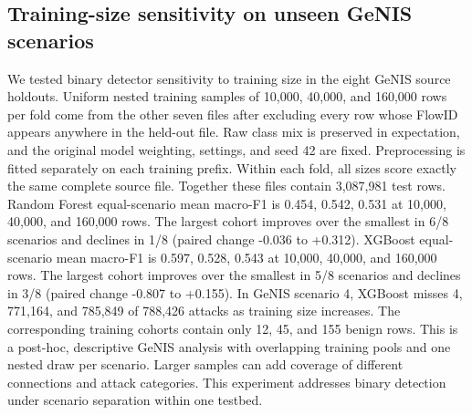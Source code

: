 \documentclass[journal,letterpaper]{IEEEtran}
\begin{document}
\subsection{Training-size sensitivity on unseen GeNIS scenarios}
We tested binary detector sensitivity to training size in the eight GeNIS source holdouts. Uniform nested training samples of 10,000, 40,000, and 160,000 rows per fold come from the other seven files after excluding every row whose FlowID appears anywhere in the held-out file. Raw class mix is preserved in expectation, and the original model weighting, settings, and seed 42 are fixed. Preprocessing is fitted separately on each training prefix. Within each fold, all sizes score exactly the same complete source file. Together these files contain 3,087,981 test rows.
Random Forest equal-scenario mean macro-F1 is 0.454, 0.542, 0.531 at 10,000, 40,000, and 160,000 rows. The largest cohort improves over the smallest in 6/8 scenarios and declines in 1/8 (paired change -0.036 to +0.312). XGBoost equal-scenario mean macro-F1 is 0.597, 0.528, 0.543 at 10,000, 40,000, and 160,000 rows. The largest cohort improves over the smallest in 5/8 scenarios and declines in 3/8 (paired change -0.807 to +0.155).
In GeNIS scenario 4, XGBoost misses 4, 771,164, and 785,849 of 788,426 attacks as training size increases. The corresponding training cohorts contain only 12, 45, and 155 benign rows. This is a post-hoc, descriptive GeNIS analysis with overlapping training pools and one nested draw per scenario. Larger samples can add coverage of different connections and attack categories. This experiment addresses binary detection under scenario separation within one testbed.
\end{document}
